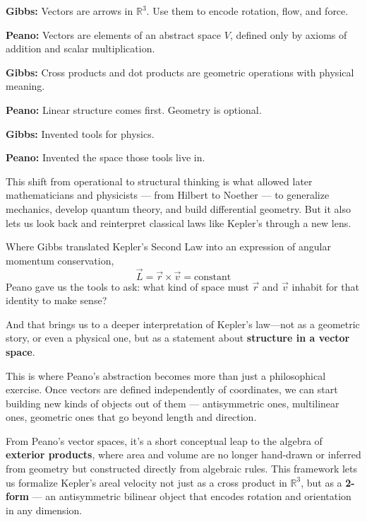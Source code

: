 \begin{tcolorbox}[colback=gray!5!white, colframe=black, title=\textbf{Sidebar: Gibbs vs. Peano — Action vs. Abstraction}, fonttitle=\bfseries, arc=1.5mm, boxrule=0.4pt]

\textbf{Gibbs:}  
Vectors are arrows in \( \mathbb{R}^3 \). Use them to encode rotation, flow, and force.

\textbf{Peano:}  
Vectors are elements of an abstract space \( V \), defined only by axioms of addition and scalar multiplication.

\medskip

\textbf{Gibbs:}  
Cross products and dot products are geometric operations with physical meaning.

\textbf{Peano:}  
Linear structure comes first. Geometry is optional.

\medskip

\textbf{Gibbs:}  
Invented tools for physics.

\textbf{Peano:}  
Invented the space those tools live in.
\end{tcolorbox}

\bigskip

This shift from operational to structural thinking is what allowed later mathematicians and physicists — from Hilbert to Noether — to generalize mechanics, develop quantum theory, and build differential geometry. But it also lets us look back and reinterpret classical laws like Kepler’s through a new lens.

Where Gibbs translated Kepler’s Second Law into an expression of angular momentum conservation,  
\[
\vec{L} = \vec{r} \times \vec{v} = \text{constant}
\]
Peano gave us the tools to ask: what kind of space must \( \vec{r} \) and \( \vec{v} \) inhabit for that identity to make sense?

And that brings us to a deeper interpretation of Kepler’s law—not as a geometric story, or even a physical one, but as a statement about \textbf{structure in a vector space}.

\bigskip

This is where Peano’s abstraction becomes more than just a philosophical exercise.  
Once vectors are defined independently of coordinates, we can start building new kinds of objects out of them — antisymmetric ones, multilinear ones, geometric ones that go beyond length and direction.

From Peano’s vector spaces, it’s a short conceptual leap to the algebra of \textbf{exterior products}, where area and volume are no longer hand-drawn or inferred from geometry but constructed directly from algebraic rules. This framework lets us formalize Kepler’s areal velocity not just as a cross product in \( \mathbb{R}^3 \), but as a \textbf{2-form} — an antisymmetric bilinear object that encodes rotation and orientation in any dimension.

